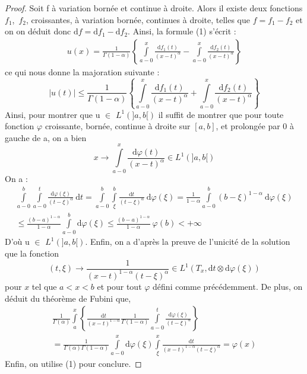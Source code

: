 \documentclass[french]{article}
\begin{document}
\begin{proof}
  Soit f à variation bornée et continue à droite. Alors il existe deux fonctions
  $f_{1}$,\ $f_{2}$, croissantes, à variation bornée, continues à droite, telles que
  $f=f_{1}-f_{2}$ et on on déduit donc
  $\mathrm{d}f=\mathrm{d}f_{1}-\mathrm{d}f_{2}$. Ainsi, la formule (1) s'écrit :
  \begin{align*}
    u(x)=\frac{1}{\Gamma(1-\alpha)} \left\{ \int\limits_{a-0}^{x}\frac{\mathrm{d}f_{1}(t)}{(x-t)^\alpha}-\int\limits_{a-0}^{x}\frac{\mathrm{d}f_{2}(t)}{(x-t)^\alpha} \right\}
  \end{align*}
  ce qui nous donne la majoration suivante :
  \begin{equation*}
    \lvert u(t) \rvert\leq\frac{1}{\Gamma(1-\alpha)} \left\{ \int\limits_{a-0}^{x}\frac{\mathrm{d}f_{1}{(t)}}{(x-t)^\alpha}+\int\limits_{a-0}^{x}\frac{\mathrm{d}f_{2}{(t)}}{(x-t)^\alpha} \right\}
  \end{equation*}
  Ainsi, pour montrer que u $\in$ $L^1(]a,b[)$ il suffit de montrer que pour
  toute fonction $\varphi$ croissante, bornée, continue à droite sur $[a,b]$,
  et prolongée par 0 à gauche de a, on a bien
  \begin{equation*}
    x \to \int\limits_{a-0}^{x}\frac{\mathrm{d}\varphi(t)}{(x-t)^\alpha} \in L^1(]a,b[)
  \end{equation*}
  On a :
  \begin{multline}
    \int\limits_{a-0}^{b}\int\limits_{a-0}^{t}\frac{\mathrm{d}\varphi(\xi)}{(t-\xi)^\alpha}\
    \mathrm{d}t=\int\limits_{a-0}^{b}\int\limits_{\xi}^{b}\frac{\mathrm{d}t}{(t-\xi)^\alpha}\
    \mathrm{d}\varphi(\xi)=\frac{1}{1-\alpha}\int\limits_{a-0}^{b}(b-\xi)^{1-\alpha}\
    \mathrm{d}\varphi(\xi)\\
    \leq\frac{(b-a)^{1-\alpha}}{1-\alpha}\int\limits_{a-0}^{b}\mathrm{d}\varphi(\xi)\leq\frac{(b-a)^{1-\alpha}}{1-\alpha}\
    \varphi(b)<+\infty
  \end{multline}
  D'où u $\in$ $L^1(]a,b[)$.
  Enfin, on a d'après la preuve de l'unicité de la solution que la fonction
  \begin{equation*}
    (t,\xi)\to\frac{1}{(x-t)^{1-\alpha}(t-\xi)^{\alpha}} \in L^1(T_{x},\mathrm{d}t \otimes \mathrm{d}\varphi(\xi))
  \end{equation*}
  pour $x$ tel que $a<x<b$ et pour tout $\varphi$ défini comme précédemment.
  De plus, on déduit du théorème de Fubini que,
  \begin{multline}
    \frac{1}{\Gamma(\alpha)}\int\limits_{a}^{x} \left\{
      \frac{\mathrm{d}t}{(x-t)^{1-\alpha}} \frac{1}{\Gamma(1-\alpha)}
      \int\limits_{a-0}^{t}\frac{\mathrm{d}\varphi(\xi)}{(t-\xi)^\alpha} \right\}\\
    =\frac{1}{\Gamma(\alpha)\Gamma(1-\alpha)}\int\limits_{a-0}^{x}\mathrm{d}\varphi(\xi)\int\limits_{\xi}^{x}\frac{\mathrm{d}t}{(x-t)^{1-\alpha}(t-\xi)^{\alpha}}=\varphi(x)
  \end{multline}
  Enfin, on utilise (1) pour conclure.
\end{proof}

\end{document}
